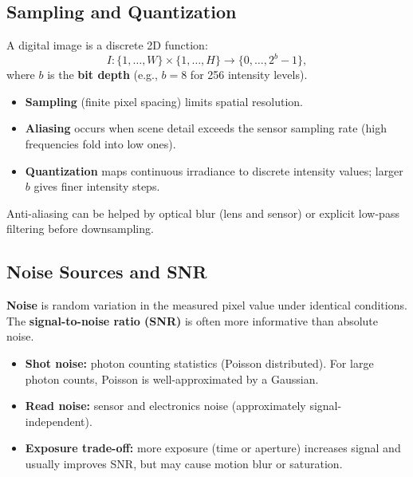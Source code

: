 \documentclass[11pt, oneside]{book}
\begin{document}
\subsection{Sampling and Quantization}

\begin{defbox}[title={Digital Image}]
A digital image is a discrete 2D function:
\[
I:\{1,\dots,W\}\times\{1,\dots,H\}\to \{0,\dots,2^b-1\},
\]
where $b$ is the \textbf{bit depth} (e.g., $b=8$ for 256 intensity levels).
\end{defbox}

\begin{itemize}
  \item \textbf{Sampling} (finite pixel spacing) limits spatial resolution.
  \item \textbf{Aliasing} occurs when scene detail exceeds the sensor sampling rate (high frequencies fold into low ones).
  \item \textbf{Quantization} maps continuous irradiance to discrete intensity values; larger $b$ gives finer intensity steps.
\end{itemize}

Anti-aliasing can be helped by optical blur (lens and sensor) or explicit low-pass filtering before downsampling.

\subsection{Noise Sources and SNR}

\begin{defbox}[title={Noise and SNR}]
\textbf{Noise} is random variation in the measured pixel value under identical conditions.
The \textbf{signal-to-noise ratio (SNR)} is often more informative than absolute noise.
\end{defbox}

\begin{itemize}
  \item \textbf{Shot noise:} photon counting statistics (Poisson distributed). For large photon counts, Poisson is well-approximated by a Gaussian.
  \item \textbf{Read noise:} sensor and electronics noise (approximately signal-independent).
  \item \textbf{Exposure trade-off:} more exposure (time or aperture) increases signal and usually improves SNR, but may cause motion blur or saturation.
\end{itemize}
\end{document}
